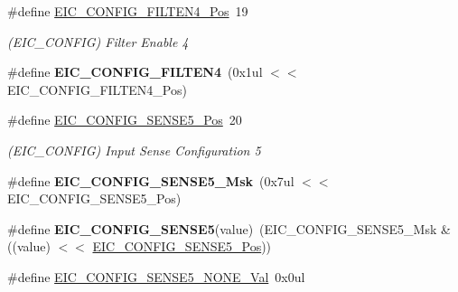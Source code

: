 \begin{DoxyCompactItemize}
\item 
\hypertarget{group___s_a_m_l21___e_i_c_ga96cc4d08e7114ef41793a0323c1890fc}{}\#define \hyperlink{group___s_a_m_l21___e_i_c_ga96cc4d08e7114ef41793a0323c1890fc}{E\+I\+C\+\_\+\+C\+O\+N\+F\+I\+G\+\_\+\+F\+I\+L\+T\+E\+N4\+\_\+\+Pos}~19\label{group___s_a_m_l21___e_i_c_ga96cc4d08e7114ef41793a0323c1890fc}

\begin{DoxyCompactList}\small\item\em (E\+I\+C\+\_\+\+C\+O\+N\+F\+I\+G) Filter Enable 4 \end{DoxyCompactList}\item 
\hypertarget{group___s_a_m_l21___e_i_c_ga2f593f4ca6b61fc82cbe2e4900655fd5}{}\#define {\bfseries E\+I\+C\+\_\+\+C\+O\+N\+F\+I\+G\+\_\+\+F\+I\+L\+T\+E\+N4}~(0x1ul $<$$<$ E\+I\+C\+\_\+\+C\+O\+N\+F\+I\+G\+\_\+\+F\+I\+L\+T\+E\+N4\+\_\+\+Pos)\label{group___s_a_m_l21___e_i_c_ga2f593f4ca6b61fc82cbe2e4900655fd5}

\item 
\hypertarget{group___s_a_m_l21___e_i_c_gace7caae074bf08e88805b591c626fb7f}{}\#define \hyperlink{group___s_a_m_l21___e_i_c_gace7caae074bf08e88805b591c626fb7f}{E\+I\+C\+\_\+\+C\+O\+N\+F\+I\+G\+\_\+\+S\+E\+N\+S\+E5\+\_\+\+Pos}~20\label{group___s_a_m_l21___e_i_c_gace7caae074bf08e88805b591c626fb7f}

\begin{DoxyCompactList}\small\item\em (E\+I\+C\+\_\+\+C\+O\+N\+F\+I\+G) Input Sense Configuration 5 \end{DoxyCompactList}\item 
\hypertarget{group___s_a_m_l21___e_i_c_ga6091029100aaca65d8ce76d3ab137444}{}\#define {\bfseries E\+I\+C\+\_\+\+C\+O\+N\+F\+I\+G\+\_\+\+S\+E\+N\+S\+E5\+\_\+\+Msk}~(0x7ul $<$$<$ E\+I\+C\+\_\+\+C\+O\+N\+F\+I\+G\+\_\+\+S\+E\+N\+S\+E5\+\_\+\+Pos)\label{group___s_a_m_l21___e_i_c_ga6091029100aaca65d8ce76d3ab137444}

\item 
\hypertarget{group___s_a_m_l21___e_i_c_ga13a13ad711a9ca5496c5fca4fbf4ee37}{}\#define {\bfseries E\+I\+C\+\_\+\+C\+O\+N\+F\+I\+G\+\_\+\+S\+E\+N\+S\+E5}(value)~(E\+I\+C\+\_\+\+C\+O\+N\+F\+I\+G\+\_\+\+S\+E\+N\+S\+E5\+\_\+\+Msk \& ((value) $<$$<$ \hyperlink{group___s_a_m_l21___e_i_c_gace7caae074bf08e88805b591c626fb7f}{E\+I\+C\+\_\+\+C\+O\+N\+F\+I\+G\+\_\+\+S\+E\+N\+S\+E5\+\_\+\+Pos}))\label{group___s_a_m_l21___e_i_c_ga13a13ad711a9ca5496c5fca4fbf4ee37}

\item 
\hypertarget{group___s_a_m_l21___e_i_c_ga1f73b11cdad345f444d6267c016e7d06}{}\#define \hyperlink{group___s_a_m_l21___e_i_c_ga1f73b11cdad345f444d6267c016e7d06}{E\+I\+C\+\_\+\+C\+O\+N\+F\+I\+G\+\_\+\+S\+E\+N\+S\+E5\+\_\+\+N\+O\+N\+E\+\_\+\+Val}~0x0ul\label{group___s_a_m_l21___e_i_c_ga1f73b11cdad345f444d6267c016e7d06}


\end{DoxyCompactItemize}
